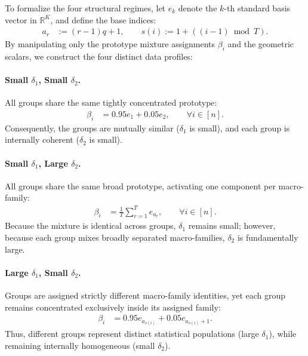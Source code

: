 \documentclass{article}
\newcommand{\bb}{\mathbb}
\newcommand{\R}{\bb R}
\newcommand{\eqdef}{:=}
\theoremstyle{plain}
\begin{document}
To formalize the four structural regimes, let $e_k$ denote the $k$-th standard basis vector in $\R^K$, and define the base indices:
\begin{align*}
    a_r&\eqdef (r-1)q+1,
    \qquad
    s(i)\eqdef 1+((i-1)\bmod T).
\end{align*}
By manipulating only the prototype mixture assignments $\beta_i$ and the geometric scalars, we construct the four distinct data profiles:

\paragraph{Small $\delta_1$, Small $\delta_2$.}
All groups share the same tightly concentrated prototype:
\begin{align*}
    \beta_i &= 0.95 e_1 + 0.05 e_2,
    \qquad \forall i\in[n].
\end{align*}
Consequently, the groups are mutually similar ($\delta_1$ is small), and each group is internally coherent ($\delta_2$ is small).

\paragraph{Small $\delta_1$, Large $\delta_2$.}
All groups share the same broad prototype, activating one component per macro-family:
\begin{align*}
    \beta_i
    &=
    \frac1T\sum_{r=1}^T e_{a_r},
    \qquad \forall i\in[n].
\end{align*}
Because the mixture is identical across groups, $\delta_1$ remains small; however, because each group mixes broadly separated macro-families, $\delta_2$ is fundamentally large.

\paragraph{Large $\delta_1$, Small $\delta_2$.}
Groups are assigned strictly different macro-family identities, yet each group remains concentrated exclusively inside its assigned family:
\begin{align*}
    \beta_i
    &=
    0.95 e_{a_{s(i)}} + 0.05 e_{a_{s(i)}+1}.
\end{align*}
Thus, different groups represent distinct statistical populations (large $\delta_1$), while remaining internally homogeneous (small $\delta_2$).
\end{document}
